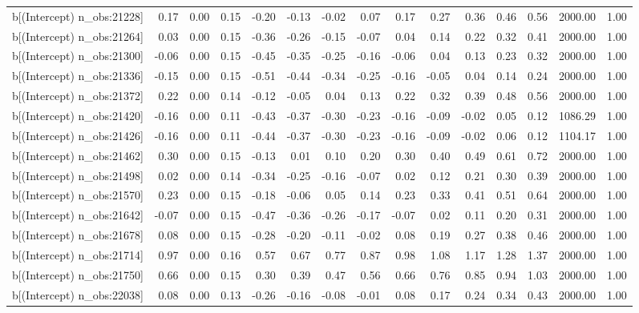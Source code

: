 \begin{table}[ht]
\begin{tabular}{rrrrrrrrrrrrrrr}
  b[(Intercept) n\_obs:21228] & 0.17 & 0.00 & 0.15 & -0.20 & -0.13 & -0.02 & 0.07 & 0.17 & 0.27 & 0.36 & 0.46 & 0.56 & 2000.00 & 1.00 \\ 
  b[(Intercept) n\_obs:21264] & 0.03 & 0.00 & 0.15 & -0.36 & -0.26 & -0.15 & -0.07 & 0.04 & 0.14 & 0.22 & 0.32 & 0.41 & 2000.00 & 1.00 \\ 
  b[(Intercept) n\_obs:21300] & -0.06 & 0.00 & 0.15 & -0.45 & -0.35 & -0.25 & -0.16 & -0.06 & 0.04 & 0.13 & 0.23 & 0.32 & 2000.00 & 1.00 \\ 
  b[(Intercept) n\_obs:21336] & -0.15 & 0.00 & 0.15 & -0.51 & -0.44 & -0.34 & -0.25 & -0.16 & -0.05 & 0.04 & 0.14 & 0.24 & 2000.00 & 1.00 \\ 
  b[(Intercept) n\_obs:21372] & 0.22 & 0.00 & 0.14 & -0.12 & -0.05 & 0.04 & 0.13 & 0.22 & 0.32 & 0.39 & 0.48 & 0.56 & 2000.00 & 1.00 \\ 
  b[(Intercept) n\_obs:21420] & -0.16 & 0.00 & 0.11 & -0.43 & -0.37 & -0.30 & -0.23 & -0.16 & -0.09 & -0.02 & 0.05 & 0.12 & 1086.29 & 1.00 \\ 
  b[(Intercept) n\_obs:21426] & -0.16 & 0.00 & 0.11 & -0.44 & -0.37 & -0.30 & -0.23 & -0.16 & -0.09 & -0.02 & 0.06 & 0.12 & 1104.17 & 1.00 \\ 
  b[(Intercept) n\_obs:21462] & 0.30 & 0.00 & 0.15 & -0.13 & 0.01 & 0.10 & 0.20 & 0.30 & 0.40 & 0.49 & 0.61 & 0.72 & 2000.00 & 1.00 \\ 
  b[(Intercept) n\_obs:21498] & 0.02 & 0.00 & 0.14 & -0.34 & -0.25 & -0.16 & -0.07 & 0.02 & 0.12 & 0.21 & 0.30 & 0.39 & 2000.00 & 1.00 \\ 
  b[(Intercept) n\_obs:21570] & 0.23 & 0.00 & 0.15 & -0.18 & -0.06 & 0.05 & 0.14 & 0.23 & 0.33 & 0.41 & 0.51 & 0.64 & 2000.00 & 1.00 \\ 
  b[(Intercept) n\_obs:21642] & -0.07 & 0.00 & 0.15 & -0.47 & -0.36 & -0.26 & -0.17 & -0.07 & 0.02 & 0.11 & 0.20 & 0.31 & 2000.00 & 1.00 \\ 
  b[(Intercept) n\_obs:21678] & 0.08 & 0.00 & 0.15 & -0.28 & -0.20 & -0.11 & -0.02 & 0.08 & 0.19 & 0.27 & 0.38 & 0.46 & 2000.00 & 1.00 \\ 
  b[(Intercept) n\_obs:21714] & 0.97 & 0.00 & 0.16 & 0.57 & 0.67 & 0.77 & 0.87 & 0.98 & 1.08 & 1.17 & 1.28 & 1.37 & 2000.00 & 1.00 \\ 
  b[(Intercept) n\_obs:21750] & 0.66 & 0.00 & 0.15 & 0.30 & 0.39 & 0.47 & 0.56 & 0.66 & 0.76 & 0.85 & 0.94 & 1.03 & 2000.00 & 1.00 \\ 
  b[(Intercept) n\_obs:22038] & 0.08 & 0.00 & 0.13 & -0.26 & -0.16 & -0.08 & -0.01 & 0.08 & 0.17 & 0.24 & 0.34 & 0.43 & 2000.00 & 1.00 \\ 

\end{tabular}
\end{table}
